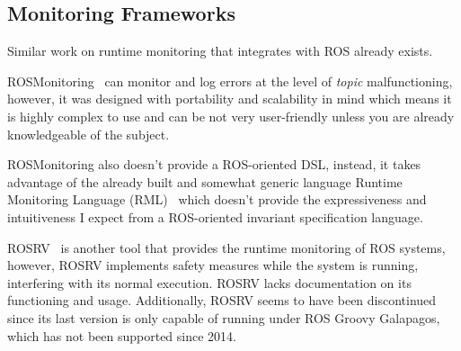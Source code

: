 \subsection{Monitoring Frameworks}
\label{ssec:monitoringframeworks}

Similar work on runtime monitoring that integrates with ROS already exists. 

ROSMonitoring~\cite{ferrando2020rosmonitoring} can monitor and log errors at the level of \textit{topic} malfunctioning, however, it was designed with portability and scalability in mind which means it is highly complex to use and can be not very user-friendly unless you are already knowledgeable of the subject. 

ROSMonitoring also doesn't provide a ROS-oriented DSL, instead, it takes advantage of the already built and somewhat generic language Runtime Monitoring Language (RML)~\cite{rml} which doesn't provide the expressiveness and intuitiveness I expect from a ROS-oriented invariant specification language. 

ROSRV~\cite{huang2014rosrv} is another tool that provides the runtime monitoring of ROS systems, however, ROSRV implements safety measures while the system is running, interfering with its normal execution. ROSRV lacks documentation on its functioning and usage. Additionally, ROSRV seems to have been discontinued since its last version is only capable of running under ROS Groovy Galapagos, which has not been supported since 2014.
